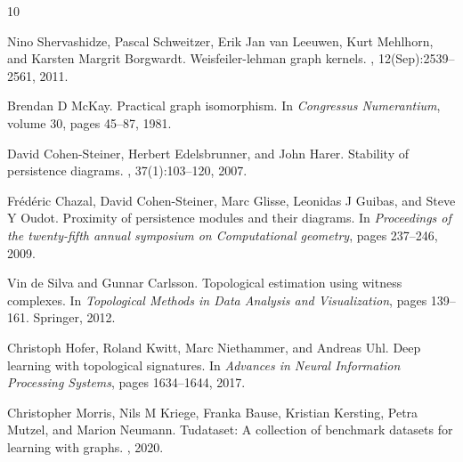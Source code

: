 \documentclass[11pt]{article}
\begin{document}

\begin{thebibliography}{10}

Nino Shervashidze, Pascal Schweitzer, Erik Jan van Leeuwen, Kurt Mehlhorn, and Karsten Margrit Borgwardt.
\newblock Weisfeiler-lehman graph kernels.
, 12(Sep):2539--2561, 2011.

Brendan D McKay.
\newblock Practical graph isomorphism.
\newblock In {\em Congressus Numerantium}, volume 30, pages 45--87, 1981.

David Cohen-Steiner, Herbert Edelsbrunner, and John Harer.
\newblock Stability of persistence diagrams.
, 37(1):103--120, 2007.

Fr{\'e}d{\'e}ric Chazal, David Cohen-Steiner, Marc Glisse, Leonidas J Guibas, and Steve Y Oudot.
\newblock Proximity of persistence modules and their diagrams.
\newblock In {\em Proceedings of the twenty-fifth annual symposium on Computational geometry}, pages 237--246, 2009.

Vin de Silva and Gunnar Carlsson.
\newblock Topological estimation using witness complexes.
\newblock In {\em Topological Methods in Data Analysis and Visualization}, pages 139--161. Springer, 2012.

Christoph Hofer, Roland Kwitt, Marc Niethammer, and Andreas Uhl.
\newblock Deep learning with topological signatures.
\newblock In {\em Advances in Neural Information Processing Systems}, pages 1634--1644, 2017.

Christopher Morris, Nils M Kriege, Franka Bause, Kristian Kersting, Petra Mutzel, and Marion Neumann.
\newblock Tudataset: A collection of benchmark datasets for learning with graphs.
, 2020.

\end{thebibliography}
\end{document}
